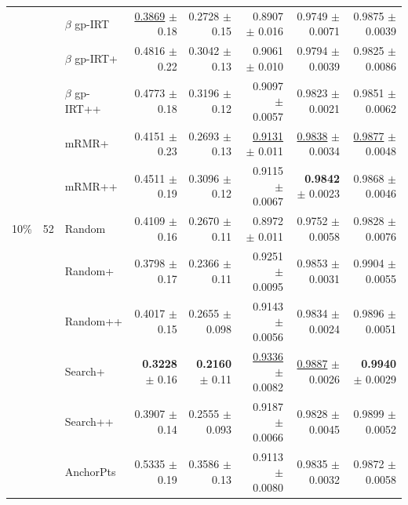 \begin{longtable}{llp{}rrrrr}
 &  & $\beta$ gp-IRT & \underline{0.3869} {\scriptsize $\pm$ 0.18} & 0.2728 {\scriptsize $\pm$ 0.15} & 0.8907 {\scriptsize $\pm$ 0.016} & 0.9749 {\scriptsize $\pm$ 0.0071} & 0.9875 {\scriptsize $\pm$ 0.0039} \\
 &  & $\beta$ gp-IRT+ & 0.4816 {\scriptsize $\pm$ 0.22} & 0.3042 {\scriptsize $\pm$ 0.13} & 0.9061 {\scriptsize $\pm$ 0.010} & 0.9794 {\scriptsize $\pm$ 0.0039} & 0.9825 {\scriptsize $\pm$ 0.0086} \\
 &  & $\beta$ gp-IRT++ & 0.4773 {\scriptsize $\pm$ 0.18} & 0.3196 {\scriptsize $\pm$ 0.12} & 0.9097 {\scriptsize $\pm$ 0.0057} & 0.9823 {\scriptsize $\pm$ 0.0021} & 0.9851 {\scriptsize $\pm$ 0.0062} \\
 &  & mRMR+ & 0.4151 {\scriptsize $\pm$ 0.23} & 0.2693 {\scriptsize $\pm$ 0.13} & \underline{0.9131} {\scriptsize $\pm$ 0.011} & \underline{0.9838} {\scriptsize $\pm$ 0.0034} & \underline{0.9877} {\scriptsize $\pm$ 0.0048} \\
 &  & mRMR++ & 0.4511 {\scriptsize $\pm$ 0.19} & 0.3096 {\scriptsize $\pm$ 0.12} & 0.9115 {\scriptsize $\pm$ 0.0067} & \textbf{0.9842} {\scriptsize $\pm$ 0.0023} & 0.9868 {\scriptsize $\pm$ 0.0046} \\
\midrule
10\% & 52 & Random & 0.4109 {\scriptsize $\pm$ 0.16} & 0.2670 {\scriptsize $\pm$ 0.11} & 0.8972 {\scriptsize $\pm$ 0.011} & 0.9752 {\scriptsize $\pm$ 0.0058} & 0.9828 {\scriptsize $\pm$ 0.0076} \\
 &  & Random+ & 0.3798 {\scriptsize $\pm$ 0.17} & 0.2366 {\scriptsize $\pm$ 0.11} & 0.9251 {\scriptsize $\pm$ 0.0095} & 0.9853 {\scriptsize $\pm$ 0.0031} & 0.9904 {\scriptsize $\pm$ 0.0055} \\
 &  & Random++ & 0.4017 {\scriptsize $\pm$ 0.15} & 0.2655 {\scriptsize $\pm$ 0.098} & 0.9143 {\scriptsize $\pm$ 0.0056} & 0.9834 {\scriptsize $\pm$ 0.0024} & 0.9896 {\scriptsize $\pm$ 0.0051} \\
 &  & Search+ & \textbf{0.3228} {\scriptsize $\pm$ 0.16} & \textbf{0.2160} {\scriptsize $\pm$ 0.11} & \underline{0.9336} {\scriptsize $\pm$ 0.0082} & \underline{0.9887} {\scriptsize $\pm$ 0.0026} & \textbf{0.9940} {\scriptsize $\pm$ 0.0029} \\
 &  & Search++ & 0.3907 {\scriptsize $\pm$ 0.14} & 0.2555 {\scriptsize $\pm$ 0.093} & 0.9187 {\scriptsize $\pm$ 0.0066} & 0.9828 {\scriptsize $\pm$ 0.0045} & 0.9899 {\scriptsize $\pm$ 0.0052} \\
 &  & AnchorPts & 0.5335 {\scriptsize $\pm$ 0.19} & 0.3586 {\scriptsize $\pm$ 0.13} & 0.9113 {\scriptsize $\pm$ 0.0080} & 0.9835 {\scriptsize $\pm$ 0.0032} & 0.9872 {\scriptsize $\pm$ 0.0058} \\

\end{longtable}

